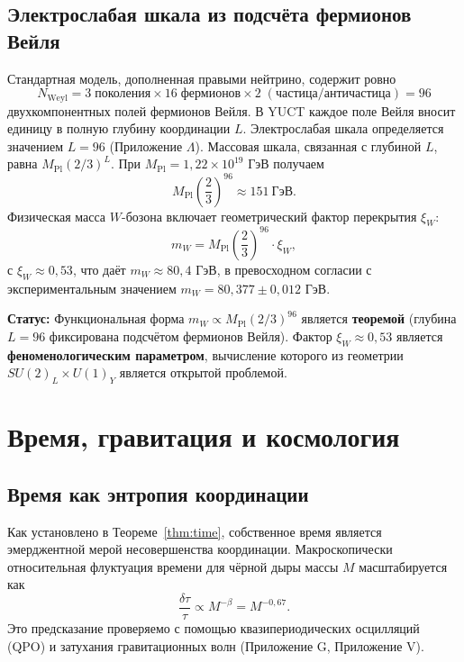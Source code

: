 \documentclass[12pt,a4paper]{article}
\begin{document}
	\subsection{Электрослабая шкала из подсчёта фермионов Вейля}
	
	Стандартная модель, дополненная правыми нейтрино, содержит ровно
	\begin{equation}
		N_{\mathrm{Weyl}} = 3\;\text{поколения} \times 16\;\text{фермионов} \times 2\;(\text{частица/античастица}) = 96
	\end{equation}
	двухкомпонентных полей фермионов Вейля. В YUCT каждое поле Вейля вносит единицу в полную глубину координации \(L\). Электрослабая шкала определяется значением \(L = 96\) (Приложение \(\Lambda\)). Массовая шкала, связанная с глубиной \(L\), равна \(M_{\mathrm{Pl}} (2/3)^{L}\). При \(M_{\mathrm{Pl}} = 1,22 \times 10^{19}\) ГэВ получаем
	\begin{equation}
		M_{\mathrm{Pl}} \left(\frac{2}{3}\right)^{96} \approx 151\ \mathrm{ГэВ}.
	\end{equation}
	Физическая масса \(W\)-бозона включает геометрический фактор перекрытия \(\xi_W\):
	\begin{equation}
		m_W = M_{\mathrm{Pl}} \left(\frac{2}{3}\right)^{96} \cdot \xi_W,
		\label{eq:mw}
	\end{equation}
	с \(\xi_W \approx 0,53\), что даёт \(m_W \approx 80,4\) ГэВ, в превосходном согласии с экспериментальным значением \(m_W = 80,377 \pm 0,012\) ГэВ.
	
	\textbf{Статус:} Функциональная форма \(m_W \propto M_{\mathrm{Pl}} (2/3)^{96}\) является \textbf{теоремой} (глубина \(L=96\) фиксирована подсчётом фермионов Вейля). Фактор \(\xi_W \approx 0,53\) является \textbf{феноменологическим параметром}, вычисление которого из геометрии \(SU(2)_L \times U(1)_Y\) является открытой проблемой.
	
	\section{Время, гравитация и космология}
	\label{sec:cosmology}
	
	\subsection{Время как энтропия координации}
	
	Как установлено в Теореме~\ref{thm:time}, собственное время является эмерджентной мерой несовершенства координации. Макроскопически относительная флуктуация времени для чёрной дыры массы \(M\) масштабируется как
	\begin{equation}
		\boxed{\frac{\delta \tau}{\tau} \propto M^{-\beta} = M^{-0,67}}.
	\end{equation}
	Это предсказание проверяемо с помощью квазипериодических осцилляций (QPO) и затухания гравитационных волн (Приложение G, Приложение V).
	
\end{document}

